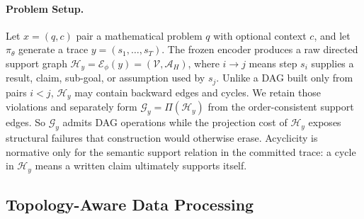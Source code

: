 \paragraph{Problem Setup.}
Let $x=(q,c)$ pair a mathematical problem $q$ with optional context $c$, and let $\pi_\theta$ generate a trace $y=(s_1,\dots,s_T)$. The frozen encoder produces a raw directed support graph $\mathcal{H}_y=\mathcal{E}_{\phi}(y)=(\mathcal{V},\mathcal{A}_{H})$, where $i\!\to\!j$ means step $s_i$ supplies a result, claim, sub-goal, or assumption used by $s_j$. Unlike a DAG built only from pairs $i<j$, $\mathcal{H}_y$ may contain backward edges and cycles. We retain those violations and separately form $\mathcal{G}_y=\Pi(\mathcal{H}_y)$ from the order-consistent support edges. So $\mathcal{G}_y$ admits DAG operations while the projection cost of $\mathcal{H}_y$ exposes structural failures that construction would otherwise erase.
Acyclicity is normative only for the semantic support relation in the committed trace: a cycle in $\mathcal{H}_y$ means a written claim ultimately supports itself. %

\subsection{Topology-Aware Data Processing}
\label{sec:data_processing}

